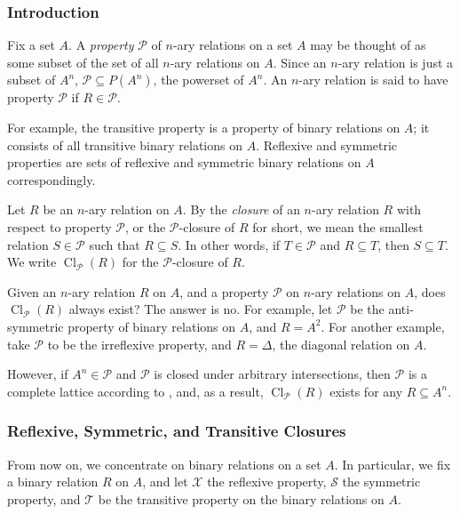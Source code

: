 \documentclass[12pt]{article}
\begin{document}

\subsubsection*{Introduction}

Fix a set $A$.  A \emph{property} $\mathcal{P}$ of $n$-ary relations on a set $A$ may be thought of as some subset of the set of all $n$-ary relations on $A$.  Since an $n$-ary relation is just a subset of $A^n$, $\mathcal{P}\subseteq P(A^n)$, the powerset of $A^n$.  An $n$-ary relation is said to have property $\mathcal{P}$ if $R \in \mathcal{P}$.

For example, the transitive property is a property of binary relations on $A$; it consists of all transitive binary relations on $A$.  Reflexive and symmetric properties are sets of reflexive and symmetric binary relations on $A$ correspondingly.

Let $R$ be an $n$-ary relation on $A$.  By the \emph{closure} of an $n$-ary relation $R$ with respect to property $\mathcal{P}$, or the $\mathcal{P}$-closure of $R$ for short, we mean the smallest relation $S\in \mathcal{P}$ such that $R\subseteq S$.  In other words, if $T\in \mathcal{P}$ and $R\subseteq T$, then $S\subseteq T$.  We write $\operatorname{Cl}_{\mathcal{P}}(R)$ for the $\mathcal{P}$-closure of $R$.  

Given an $n$-ary relation $R$ on $A$, and a property $\mathcal{P}$ on $n$-ary relations on $A$, does $\operatorname{Cl}_{\mathcal{P}}(R)$ always exist?  The answer is no.  For example, let $\mathcal{P}$ be the anti-symmetric property of binary relations on $A$, and $R=A^2$.  For another example, take $\mathcal{P}$ to be the irreflexive property, and $R=\Delta$, the diagonal relation on $A$.

However, if $A^n \in \mathcal{P}$ and $\mathcal{P}$ is closed under arbitrary intersections, then $\mathcal{P}$ is a complete lattice according to , and, as a result, $\operatorname{Cl}_{\mathcal{P}}(R)$ exists for any $R\subseteq A^n$.

\subsubsection*{Reflexive, Symmetric, and Transitive Closures}

From now on, we concentrate on binary relations on a set $A$.  In particular, we fix a binary relation $R$ on $A$, and let $\mathcal{X}$ the reflexive property, $\mathcal{S}$ the symmetric property, and $\mathcal{T}$ be the transitive property on the binary relations on $A$.
\end{document}
